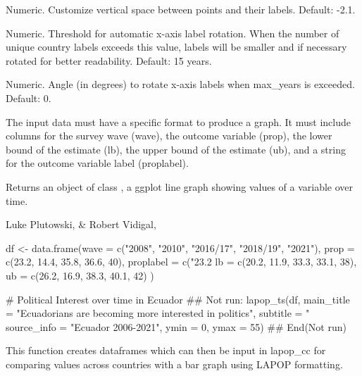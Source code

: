 \documentclass[a4paper]{book}
\begin{document}
\begin{Arguments}
\begin{ldescription}
\item[\code{label\_vjust}] Numeric. Customize vertical space between points and their labels.
Default: -2.1.

\item[\code{max\_years}] Numeric. Threshold for automatic x-axis label rotation. When the number of unique
country labels exceeds this value, labels will be smaller and if necessary rotated for better readability.
Default: 15 years.

\item[\code{label\_angle}] Numeric. Angle (in degrees) to rotate x-axis labels when max\_years is exceeded. Default: 0.
\end{ldescription}
\end{Arguments}
%
\begin{Details}
The input data must have a specific format to produce a graph.  It must include columns for
the survey wave (wave), the outcome variable (prop), the lower bound of the estimate (lb),
the upper bound of the estimate (ub), and a string for the outcome variable label (proplabel).
\end{Details}
%
\begin{Value}
Returns an object of class , a ggplot line graph showing
values of a variable over time.
\end{Value}
%
\begin{Author}
Luke Plutowski,  \& Robert Vidigal, 
\end{Author}
%
\begin{Examples}
\begin{ExampleCode}
df <- data.frame(wave = c("2008", "2010", "2016/17", "2018/19", "2021"),
prop = c(23.2, 14.4, 35.8, 36.6, 40),
proplabel = c("23.2%
lb = c(20.2, 11.9, 33.3, 33.1, 38),
ub = c(26.2, 16.9, 38.3, 40.1, 42)
)

# Political Interest over time in Ecuador
## Not run: 
lapop_ts(df,
 main_title = "Ecuadorians are becoming more interested in politics",
 subtitle = "%
 source_info = "Ecuador 2006-2021",
 ymin = 0,
 ymax = 55)
## End(Not run)
\end{ExampleCode}
\end{Examples}
%
\begin{Description}
This function creates dataframes which can then be input in lapop\_cc for
comparing values across countries with a bar graph using LAPOP formatting.
\end{Description}
\end{document}
